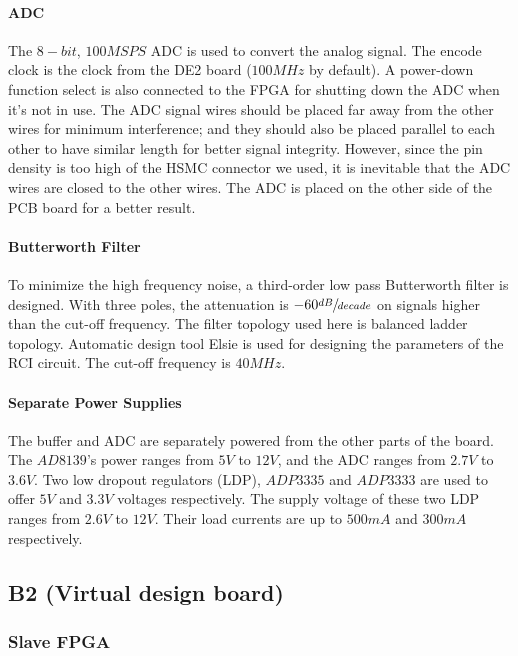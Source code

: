 \paragraph{ADC}
The $8-bit$, $100MSPS$ ADC is used to convert the analog signal. The encode clock is the clock from the DE2 board ($100MHz$ by default). A power-down function select is also connected to the FPGA for shutting down the ADC when it’s not in use. The ADC signal wires should be placed far away from the other wires for minimum interference; and they should also be placed parallel to each other to have similar length for better signal integrity. However, since the pin density is too high of the HSMC connector we used, it is inevitable that the ADC wires are closed to the other wires. The ADC is placed on the other side of the PCB board for a better result.

\paragraph{Butterworth Filter}
To minimize the high frequency noise, a third-order low pass Butterworth filter is designed. With three poles, the attenuation is $-60 \sfrac{dB}{decade}$ on signals higher than the cut-off frequency. The filter topology used here is balanced ladder topology. Automatic design tool Elsie is used for designing the parameters of the RCI circuit. The cut-off frequency is $40MHz$.

\paragraph{Separate Power Supplies}
The buffer and ADC are separately powered from the other parts of the board. The $AD8139$’s power ranges from $5V$ to $12V$, and the ADC ranges from $2.7V$ to $3.6V$. Two low dropout regulators (LDP), $ADP3335$ and $ADP3333$ are used to offer $5V$ and $3.3V$ voltages respectively. The supply voltage of these two LDP ranges from $2.6V$ to $12V$. Their load currents are up to $500mA$ and $300mA$ respectively.

\subsection{B2 (Virtual design board)}

\subsubsection{Slave FPGA}

